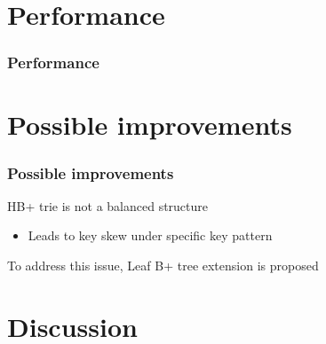 \documentclass[aspectratio=169]{beamer}
\begin{document}
\section{Performance}
\begin{frame}[t]
    \frametitle{Performance}
\end{frame}
\section{Possible improvements}
\begin{frame}[t]
    \frametitle{Possible improvements}
    HB+ trie is not a balanced structure
    \begin{itemize}
    	\item Leads to key skew under specific key pattern
    \end{itemize}

	To address this issue, Leaf B+ tree extension is proposed
	\begin{figure}%
		\centering
		\qquad
	\end{figure}
\end{frame}
\section{Discussion}
\end{document}
